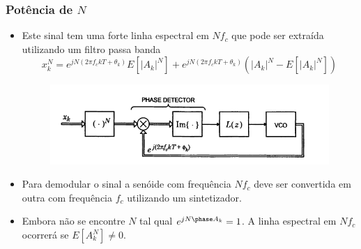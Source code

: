 \begin{frame}
	\frametitle{Potência de $N$}
	\begin{itemize}
		
		\item Este sinal tem uma forte linha espectral em $N f_c$ que pode ser extraída utilizando um filtro passa banda
		\begin{equation*}
		x_{k}^N=e^{jN(2\pi f_ckT +\theta_k)}E[|A_k|^N]+e^{jN(2\pi f_ckT +\theta_k)}(|A_k|^N-E[|A_k|^N])
		\end{equation*}
		\vspace{-0.7cm}
		\begin{figure}
			\includegraphics[width=0.7\columnwidth]{figs/powerN}
		\end{figure}
		
		\item Para demodular o sinal a senóide com frequência $N f_c$ deve ser convertida em outra com frequência $f_c$ utilizando um sintetizador.
		
		\item Embora não se encontre $N$ tal qual $e^{jN \phase A_k}=1$. A linha espectral em $N f_c$ ocorrerá se $E[A_k^N] \neq 0$.
		
	\end{itemize}
	
\end{frame}


